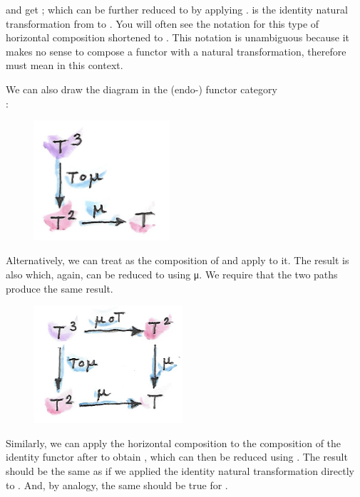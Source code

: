 \noindent
and get ; which can be further reduced to  by
applying .  is the identity natural transformation
from  to . You will often see the notation for this
type of horizontal composition  shortened to
. This notation is unambiguous because it makes no sense to
compose a functor with a natural transformation, therefore 
must mean  in this context.

We can also draw the diagram in the (endo-) functor category\\
\code{{[}C, C{]}}:

\begin{figure}[H]
\centering
\includegraphics[width=50mm]{images/assoc2.png}
\end{figure}

\noindent
Alternatively, we can treat  as the composition of
 and apply  to it. The result is also
 which, again, can be reduced to  using μ. We
require that the two paths produce the same result.

\begin{figure}[H]
\centering
\includegraphics[width=2.16667in]{images/assoc.png}
\end{figure}

\noindent
Similarly, we can apply the horizontal composition  to the
composition of the identity functor  after  to
obtain , which can then be reduced using . The
result should be the same as if we applied the identity natural
transformation directly to . And, by analogy, the same should
be true for .


